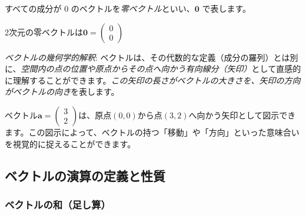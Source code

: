 \begin{dfn}[零ベクトル] \label{vector_zero}
すべての成分が $0$ のベクトルを\emph{零ベクトル}といい、$\bm{0}$ で表します。
\end{dfn}

\begin{ex}
2次元の零ベクトルは$\bm{0} = \begin{pmatrix} 0 \\ 0 \end{pmatrix}$
\end{ex}

\emph{ベクトルの幾何学的解釈}: ベクトルは、その代数的な定義（成分の羅列）とは別に、\emph{空間内の点の位置や原点からその点へ向かう有向線分（矢印）}として直感的に理解することができます。\emph{この矢印の長さがベクトルの大きさを、矢印の方向がベクトルの向き}を表します。

\begin{ex}
ベクトル$\bm{a} = \begin{pmatrix} 3 \\ 2 \end{pmatrix}$は、原点$(0,0)$から点$(3,2)$へ向かう矢印として図示できます。この図示によって、ベクトルの持つ「移動」や「方向」といった意味合いを視覚的に捉えることができます。
\begin{center}
\end{center}
\end{ex}

\subsection{ベクトルの演算の定義と性質}

\subsubsection{ベクトルの和（足し算）}

